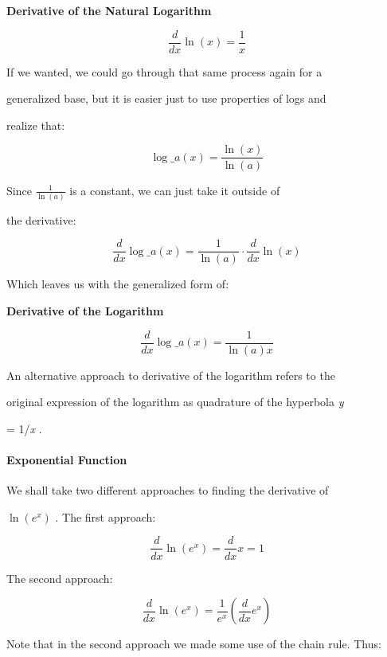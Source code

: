 \textbf{Derivative of the Natural Logarithm}

$$\frac{d}{dx}\ln(x)=\frac{1}{x}$$         



If we wanted, we could go through that same process again for a

generalized base, but it is easier just to use properties of logs and

realize that:



$$\log\_a(x)=\frac{\ln(x)}{\ln(a)}$$



Since $\frac{1}{\ln(a)}$ is a constant, we can just take it outside of

the derivative:



$$\frac{d}{dx}\log\_a(x)=\frac{1}{\ln(a)}\cdot\frac{d}{dx}\ln(x)$$



Which leaves us with the generalized form of:



 \textbf{Derivative of the Logarithm}

 $$\frac{d}{dx}\log\_a(x)=\frac{1}{\ln(a)x}$$ 



An alternative approach to derivative of the logarithm refers to the

original expression of the logarithm as quadrature of the hyperbola \textit{y}

= 1/\textit{x} .



\paragraph{Exponential Function}



We shall take two different approaches to finding the derivative of

$\ln(e^x)$ . The first approach:



$$\frac{d}{dx}\ln(e^x)=\frac{d}{dx}x=1$$



The second approach:



$$\frac{d}{dx}\ln(e^x)=\frac{1}{e^x}\left(\frac{d}{dx}e^x\right)$$



Note that in the second approach we made some use of the chain rule. Thus:



